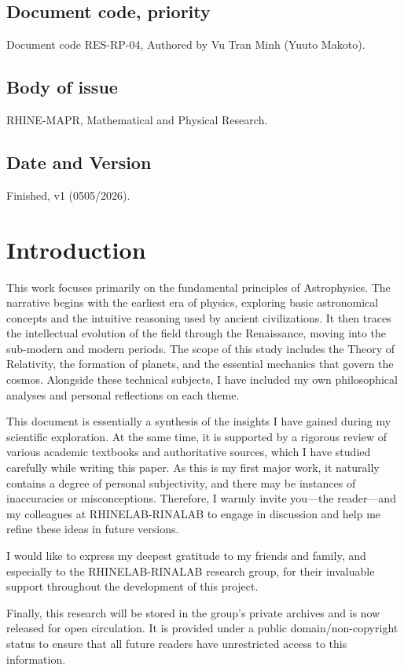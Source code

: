\documentclass[10pt,a4paper]{article}
\begin{document}
\subsection{Document code, priority}

Document code RES-RP-04, Authored by Vu Tran Minh (Yuuto Makoto). 
\subsection{Body of issue}

RHINE-MAPR, Mathematical and Physical Research. 
\subsection{Date and Version}

Finished, v1 (0505/2026).
\section{Introduction}

This work focuses primarily on the fundamental principles of Astrophysics. The narrative begins with the earliest era of physics, exploring basic astronomical concepts and the intuitive reasoning used by ancient civilizations. It then traces the intellectual evolution of the field through the Renaissance, moving into the sub-modern and modern periods. The scope of this study includes the Theory of Relativity, the formation of planets, and the essential mechanics that govern the cosmos. Alongside these technical subjects, I have included my own philosophical analyses and personal reflections on each theme.

This document is essentially a synthesis of the insights I have gained during my scientific exploration. At the same time, it is supported by a rigorous review of various academic textbooks and authoritative sources, which I have studied carefully while writing this paper. As this is my first major work, it naturally contains a degree of personal subjectivity, and there may be instances of inaccuracies or misconceptions. Therefore, I warmly invite you—the reader—and my colleagues at RHINELAB-RINALAB to engage in discussion and help me refine these ideas in future versions.

I would like to express my deepest gratitude to my friends and family, and especially to the RHINELAB-RINALAB research group, for their invaluable support throughout the development of this project.

Finally, this research will be stored in the group's private archives and is now released for open circulation. It is provided under a public domain/non-copyright status to ensure that all future readers have unrestricted access to this information.
\end{document}
